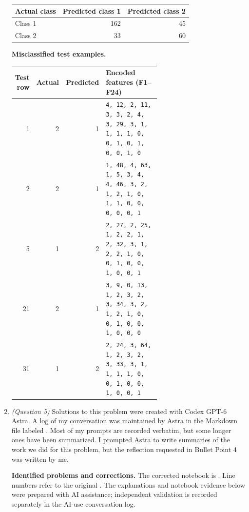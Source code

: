 \documentclass[12pt]{article}
\begin{document}
\begin{enumerate}
\begin{minipage}{\linewidth}
\begin{center}
\begin{tabular}{lrr}
\hline
Actual class & Predicted class 1 & Predicted class 2 \\
\hline
Class 1 & 162 & 45 \\
Class 2 & 33 & 60 \\
\hline
\end{tabular}
\end{center}

\end{minipage}
\par\medskip

\noindent\textbf{Misclassified test examples.}
\begin{center}
\small
\renewcommand{\arraystretch}{1.3}
\begin{tabular}{rrrp{0.62\linewidth}}
\hline
Test row & Actual & Predicted & Encoded features (F1--F24) \\
\hline
1 & 2 & 1 & \texttt{4, 12, 2, 11, 3, 3, 2, 4, 3, 29, 3, 1,}\newline
\texttt{1, 1, 1, 0, 0, 1, 0, 1, 0, 0, 1, 0} \\
\hline
2 & 2 & 1 & \texttt{1, 48, 4, 63, 1, 5, 3, 4, 4, 46, 3, 2,}\newline
\texttt{1, 2, 1, 0, 1, 1, 0, 0, 0, 0, 0, 1} \\
\hline
5 & 1 & 2 & \texttt{2, 27, 2, 25, 1, 2, 2, 1, 2, 32, 3, 1,}\newline
\texttt{2, 2, 1, 0, 0, 1, 0, 0, 1, 0, 0, 1} \\
\hline
21 & 2 & 1 & \texttt{3, 9, 0, 13, 1, 2, 3, 2, 3, 34, 3, 2,}\newline
\texttt{1, 2, 1, 0, 0, 1, 0, 0, 1, 0, 0, 0} \\
\hline
31 & 1 & 2 & \texttt{2, 24, 3, 64, 1, 2, 3, 2, 3, 33, 3, 1,}\newline
\texttt{1, 1, 1, 0, 0, 1, 0, 0, 1, 0, 0, 1} \\
\hline
\end{tabular}
\end{center}

\item \emph{(Question 5)} Solutions to this problem were created with Codex GPT-6 Astra. A log of my conversation was maintained by Astra in the Markdown file labeled . Most of my prompts
are recorded verbatim, but some longer ones have been summarized. I prompted Astra to write summaries of the work we did for this problem, but the reflection requested in Bullet Point 4 was written by me. 
\par\medskip
\noindent\textbf{Identified problems and corrections.}
The corrected notebook is .
Line numbers refer to the original .
The explanations and notebook evidence below were prepared with AI assistance;
independent validation is recorded separately in the AI-use conversation log.


\end{enumerate}
\end{document}
